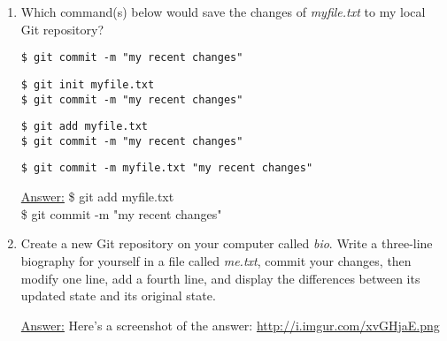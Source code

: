 \documentclass[12pt]{article}
\begin{document}
\begin{enumerate}
\item Which command(s) below would save the changes of \emph{myfile.txt} to my local Git repository?
\begin{flushleft}
\texttt{\$ git commit -m "my recent changes"}
\end{flushleft}
\begin{flushleft}
\texttt{\$ git init myfile.txt \\ \$ git commit -m "my recent changes"}
\end{flushleft}
\begin{flushleft}
\texttt{\$ git add myfile.txt \\ \$ git commit -m "my recent changes"}
\end{flushleft}
\begin{flushleft}
\texttt{\$ git commit -m myfile.txt "my recent changes"}
\end{flushleft}
\begin{center}
\textsf{\underline{Answer:} \$ git add myfile.txt \\ \$ git commit -m "my recent changes"}
\end{center}

\item Create a new Git repository on your computer called \emph{bio}. Write a three-line biography for yourself in a file called \emph{me.txt}, commit your changes, then modify one line, add a fourth line, and display the differences between its updated state and its original state.
\begin{center}
\textsf{\underline{Answer:} Here's a screenshot of the answer: \href{http://i.imgur.com/xvGHjaE.png}{http://i.imgur.com/xvGHjaE.png}}
\end{center}
\end{enumerate}
\end{document}
